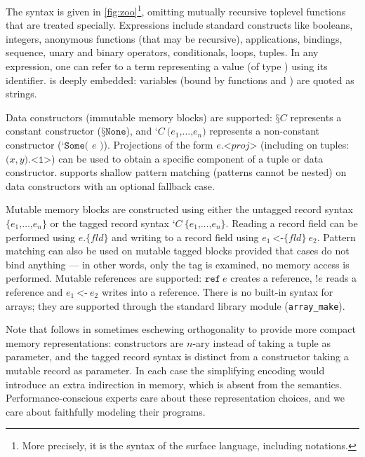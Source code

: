 

The \ZooLang syntax is given in \cref{fig:zoo}\footnote{More precisely, it is the syntax of the surface language, including \Rocq notations.}, omitting mutually recursive toplevel functions that are treated specially.
Expressions include standard constructs like booleans, integers, anonymous functions (that may be recursive), applications,  bindings, sequence, unary and binary operators, conditionals,  loops, tuples.
In any expression, one can refer to a \Rocq term representing a \ZooLang value (of type ) using its \Rocq identifier.
\ZooLang is deeply embedded: variables (bound by functions and ) are quoted as strings.

Data constructors (immutable memory blocks) are supported: $\texttt{§}C$ represents a constant constructor (\eg $\texttt{§}\texttt{None}$), and $\texttt{‘} C\ \texttt{(} e_1 \texttt{,} \dots \texttt{,} e_n \texttt{)}$ represents a non-constant constructor (\eg $\texttt{‘} \texttt{Some( } e \texttt{ )}$).
Projections of the form $e \texttt{.<} \mathit{proj} \texttt{>}$ (including on tuples: $\texttt{(} x, y \texttt{).<1>}$) can be used to obtain a specific component of a tuple or data constructor.
\ZooLang supports shallow pattern matching (patterns cannot be nested) on data constructors with an optional fallback case.

Mutable memory blocks are constructed using either the untagged record syntax $\texttt{\{} e_1 \texttt{,} \dots \texttt{,} e_n \texttt{\}}$ or the tagged record syntax $\texttt{‘} C\ \texttt{\{} e_1 \texttt{,} \dots \texttt{,} e_n \texttt{\}}$.
Reading a record field can be performed using $e \texttt{.\{} \mathit{fld} \texttt{\}}$ and writing to a record field using $e_1\ \texttt{<-\{} \mathit{fld} \texttt{\}}\ e_2$.
Pattern matching can also be used on mutable tagged blocks provided that cases do not bind anything --- in other words, only the tag is examined, no memory access is performed.
Mutable references are supported: $\texttt{ref}\ e$ creates a reference, $\texttt{!} e$ reads a reference and $e_1\ \texttt{<-}\ e_2$ writes into a reference.
There is no built-in syntax for arrays; they are supported through the  standard library module (\eg \texttt{array\_make}).

Note that \ZooLang follows \OCaml in sometimes eschewing orthogonality to provide more compact memory representations: constructors are $n$-ary instead of taking a tuple as parameter, and the tagged record syntax is distinct from a constructor taking a mutable record as parameter. In each case the simplifying encoding would introduce an extra indirection in memory, which is absent from the \ZooLang semantics. Performance-conscious experts care about these representation choices, and we care about faithfully modeling their programs.

